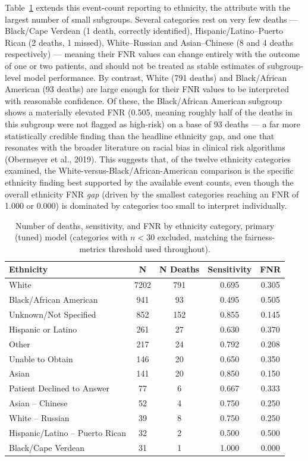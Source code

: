 \documentclass[12pt,a4paper]{report}
\begin{document}
Table~\ref{tab:ethnicity-subgroups} extends this event-count reporting to ethnicity, the attribute with the largest number of small subgroups. Several categories rest on very few deaths --- Black/Cape Verdean (1 death, correctly identified), Hispanic/Latino--Puerto Rican (2 deaths, 1 missed), White--Russian and Asian--Chinese (8 and 4 deaths respectively) --- meaning their FNR values can change entirely with the outcome of one or two patients, and should not be treated as stable estimates of subgroup-level model performance. By contrast, White (791 deaths) and Black/African American (93 deaths) are large enough for their FNR values to be interpreted with reasonable confidence. Of these, the Black/African American subgroup shows a materially elevated FNR (0.505, meaning roughly half of the deaths in this subgroup were not flagged as high-risk) on a base of 93 deaths --- a far more statistically credible finding than the headline ethnicity gap, and one that resonates with the broader literature on racial bias in clinical risk algorithms (Obermeyer et al., 2019). This suggests that, of the twelve ethnicity categories examined, the White-versus-Black/African-American comparison is the specific ethnicity finding best supported by the available event counts, even though the overall ethnicity FNR \emph{gap} (driven by the smallest categories reaching an FNR of 1.000 or 0.000) is dominated by categories too small to interpret individually.


\begin{table}[H]
\centering
\caption{Number of deaths, sensitivity, and FNR by ethnicity category, primary (tuned) model (categories with $n<30$ excluded, matching the fairness-metrics threshold used throughout).}
\label{tab:ethnicity-subgroups}
\small
\begin{tabular}{lcccc}
\toprule
Ethnicity & N & N Deaths & Sensitivity & FNR \\
\midrule
White & 7202 & 791 & 0.695 & 0.305 \\
Black/African American & 941 & 93 & 0.495 & 0.505 \\
Unknown/Not Specified & 852 & 152 & 0.855 & 0.145 \\
Hispanic or Latino & 261 & 27 & 0.630 & 0.370 \\
Other & 217 & 24 & 0.792 & 0.208 \\
Unable to Obtain & 146 & 20 & 0.650 & 0.350 \\
Asian & 141 & 20 & 0.850 & 0.150 \\
Patient Declined to Answer & 77 & 6 & 0.667 & 0.333 \\
Asian -- Chinese & 52 & 4 & 0.750 & 0.250 \\
White -- Russian & 39 & 8 & 0.750 & 0.250 \\
Hispanic/Latino -- Puerto Rican & 32 & 2 & 0.500 & 0.500 \\
Black/Cape Verdean & 31 & 1 & 1.000 & 0.000 \\
\bottomrule
\end{tabular}
\end{table}
\end{document}
